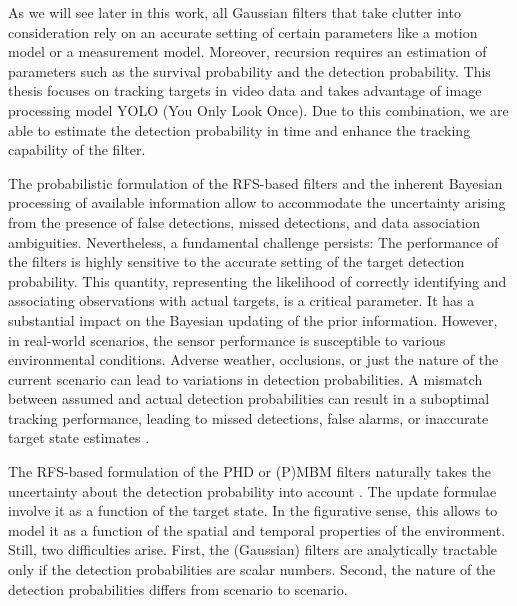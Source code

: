As we will see later in this work, all Gaussian filters that take clutter into consideration rely on an accurate
setting
of certain
parameters like a motion model or a measurement model. Moreover, recursion requires an estimation of parameters such as
the survival probability and the detection probability. This thesis focuses on tracking targets in video
data and takes advantage of image processing model YOLO (You Only Look Once). Due to this combination, we are able to
estimate the detection probability in time and enhance the tracking capability of the filter.

The probabilistic formulation of the RFS-based filters and the inherent Bayesian processing of available information allow to accommodate the uncertainty arising from the presence of false detections, missed detections, and data association ambiguities. Nevertheless, a fundamental challenge persists: The performance of the filters is highly sensitive to the accurate setting of the target detection probability. This quantity, representing the likelihood of correctly identifying and associating observations with actual targets, is a critical parameter. It has a substantial impact on the Bayesian updating of the prior information.
However, in real-world scenarios, the sensor performance is susceptible to various environmental conditions. Adverse weather, occlusions, or just the nature of the current scenario can lead to variations in detection probabilities. A mismatch between assumed and actual detection probabilities can result in a suboptimal tracking performance, leading to missed detections, false alarms, or inaccurate target state estimates \cite{Hendeby2014Gaussian}.

The RFS-based formulation of the PHD or (P)MBM filters naturally takes the uncertainty about the detection probability into account \cite{Hendeby2014Gaussian}. The update formulae involve it as a function of the target state. In the figurative sense, this allows to model it as a function of the spatial and temporal properties of the environment.
Still, two difficulties arise. First, the (Gaussian) filters are analytically tractable only if the detection probabilities are scalar numbers. Second, the nature of the detection probabilities differs from scenario to scenario.

